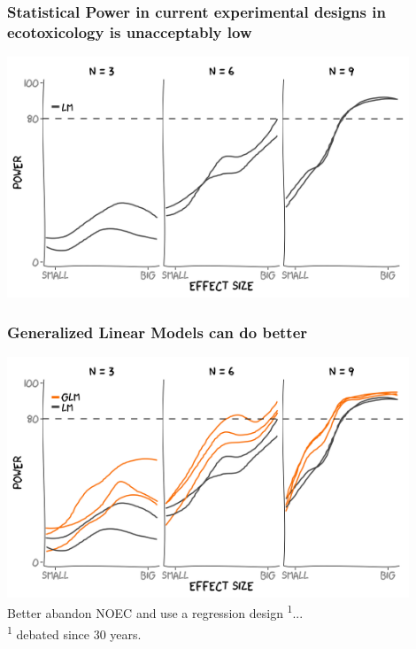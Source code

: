 \documentclass[12pt
, t
]{beamer}
\begin{document}
\begin{frame}

\end{frame}


\begin{frame}
\frametitle{Statistical Power in current experimental designs in ecotoxicology is unacceptably low}
\center
\includegraphics[width = 0.9\textwidth]{fig/glm2.png} \\
\end{frame}


\begin{frame}
\frametitle{Generalized Linear Models can do better}
\center
\includegraphics[width = 0.9\textwidth]{fig/glm1.png} \\
\pause
\center
Better abandon NOEC and use a regression design \textsuperscript{1}...\\
\tiny \textsuperscript{1} debated since 30 years.
\end{frame}
\end{document}
